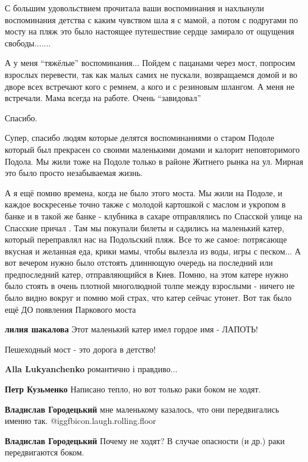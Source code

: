 \begin{itemize}
С большим удовольствием прочитала ваши воспоминания и нахлынули воспоминания
детства с каким чувством шла я с мамой, а потом с подругами по мосту на пляж это
было настоящее путешествие сердце замирало от ощущения свободы.......


А у меня \enquote{тяжёлые} воспоминания... Пойдем с пацанами через мост, попросим
взрослых перевести, так как малых самих не пускали, возвращаемся домой и во
дворе всех встречают кого с ремнем, а кого и с резиновым шлангом. А меня не
встречали. Мама всегда на работе. Очень \enquote{завидовал}


Спасибо.


Супер, спасибо людям которые делятся воспоминаниями о старом Подоле который был
прекрасен со своими маленькими домами и калорит неповторимого Подола. Мы жили
тоже на Подоле только в районе Житнего рынка на ул. Мирная это было просто
незабываемая жизнь.


А я ещё помню времена, когда не было этого моста. Мы жили на Подоле, и каждое
воскресенье точно также с молодой картошкой с маслом и укропом в банке и в
такой же банке - клубника в сахаре отправлялись по Спасской улице на Спасские
причал . Там мы покупали билеты и садились на маленький катер, который
переправлял нас на Подольский пляж. Все то же самое: потрясающе вкусная и
желанная еда, крики мамы, чтобы вылезла из воды, игры с песком... А вот вечером
нужно было отстоять длиннющую очередь на последний или предпоследний катер,
отправляющийся в Киев. Помню, на этом катере нужно было стоять в очень плотной
многолюдной толпе между взрослыми - ничего не было видно вокруг и помню мой
страх, что катер сейчас утонет. Вот так было ещё ДО появления Паркового моста


\textbf{лилия шакалова} Этот маленький катер имел гордое имя - ЛАПОТЬ!

Пешеходный мост - это дорога в детство!

\textbf{Alla Lukyanchenko} романтично і правдиво...

\textbf{Петр Кузьменко}
Написано тепло, но вот только раки боком не ходят.

\begin{itemize} %
\textbf{Владислав Городецький} мне маленькому казалось, что они передвигались именно так. @igg{fbicon.laugh.rolling.floor} 

\textbf{Владислав Городецький} Почему не ходят? В случае опасности (и др.) раки передвигаются боком.
\end{itemize} %


\end{itemize} %
